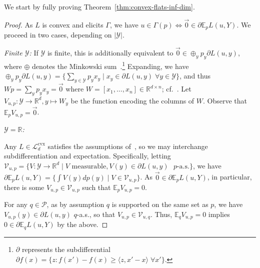 \documentclass{article} %
\newcommand{\Comments}{0}
\newcommand{\mynote}[2]{\ifnum\Comments=1\textcolor{#1}{#2}\fi}
\newcommand{\mytodo}[2]{\ifnum\Comments=1%
	\todo[linecolor=#1!80!black,backgroundcolor=#1,bordercolor=#1!80!black]{#2}\fi}
\newcommand{\jessie}[1]{\mynote{teal}{[JF: #1]}}
\newcommand{\btw}[1]{}%
\newcommand{\reals}{\mathbb{R}}
\newcommand{\supp}{\mathrm{supp}}
\newcommand{\E}{\mathbb{E}}
\newcommand{\Lcvx}{\mathcal{L}^{\mathrm{cvx}}}
\renewcommand{\P}{\mathcal{P}}
\newcommand{\V}{\mathcal{V}}
\newcommand{\Y}{\mathcal{Y}}
\newcommand{\exploss}[3]{\E_{#3} #1(#2,Y)}
\newcommand{\inprod}[2]{\langle #1, #2 \rangle}
\begin{document}
We start by fully proving Theorem~\ref{thm:convex-flats-inf-dim}.
\convexflats*
\begin{proof}
	As $L$ is convex and elicits $\Gamma$, we have $u \in \Gamma(p) \iff \vec 0 \in \partial \exploss{L}{u}{p}$. 
	We proceed in two cases, depending on $|\Y|$.
	
	\emph{Finite $\Y$: }
	If $\Y$ is finite, this is additionally equivalent to $\vec 0 \in \oplus_y p_y \partial L(u,y)$, where $\oplus$ denotes the Minkowski sum~\citep[Theorem 4.1.1]{hiriart2012fundamentals}.\footnote{$\partial$ represents the subdifferential $\partial f(x) = \{z : f(x') - f(x) \geq \inprod{z}{x'-x}\; \forall x' \}$.}
	Expanding, we have $\oplus_y p_y \partial L(u,y) = \{ \sum_{y\in\Y} p_y x_y \mid x_y \in \partial L(u,y) \; \forall y\in\Y\}$, and thus $W p = \sum_y p_y x_y = \vec 0$ where $W = [x_1, \ldots, x_n] \in \reals^{d\times n}$; cf.~\cite[$\mathbf{A}^m$ in Theorem 16]{ramaswamy2016convex}.
	Let $V_{u,p} : \Y \to \reals^d, y \mapsto W_y$ be the function encoding the columns of $W$.
	Observe that $\E_p V_{u,p} = \vec 0$.				
	
	\emph{$\Y=\reals$: }
	\btw{Note: this should work for any infinite $\Y$ so long as you have a good $\sigma$-algebra... working at least with $\Y \subseteq \reals$ just makes things easier since we can take the Borel $\sigma$-algebra for granted.}
	Any $L \in \Lcvx_d$ satisfies the assumptions of~\cite{ioffe1969minimization}, so we may interchange subdifferentiation and expectation.
	Specifically, letting $\V_{u,p} = \{V:\Y\to\reals^d \mid V \text{ measurable}, V(y) \in \partial L(u,y) \text{ $p$-a.s.}\}$, we have
	$\partial \E_p L(u,Y) = \{\int V(y)dp(y) \mid V\in\V_{u,p}\}$.
	As $\vec 0 \in \partial \E_p L(u,Y)$, in particular, there is some $V_{u,p} \in \V_{u,p}$ such that $\E_p V_{u,p} = 0$.
	\btw{Fleshing this out: $\exists E \subseteq \mathcal{B}(\Y)$ so that $p(E) = 0$ and $V(y) \in \partial L(u,y) \forall y \in E^c$.  Claim $q(E) = 0$, which would complete the claim that $V(y) \in \partial L(u,y) q$-a.s.  For contradiction, if $q(E) > 0$, then $\exists x \in E$ and open neighborhood $N_x \ni x$ with $q(N_x) > 0$.  Since $\supp(p) = \supp(q)$, we then have $p(N_x) >0$, contradicting $p(E) = 0$, and hence $V(y) \in \partial L(u,y)$ not $p$-a.s.  Therefore, we must have $q(E) = 0$, so $V(y) \in \partial L(u,y) q$-a.s.}
	For any $q\in\P$, as by assumption $q$ is supported on the same set as $p$, we have $V_{u,p}(y)\in\partial L(u,y)$ $q$-a.s., so that $V_{u,p}\in\V_{u,q}$\btw{I'm a bit too tired to see exactly how this follows, but it seems intuitively obvious. I'm okay to punt on it for the submission, but if someone has time to check, that would be great! \jessie{See above margin comment.  I think it's too much detail for the conference submission, but feel free to change my mind.}}.
	Thus, $\E_q V_{u,p} = 0$ implies $0\in\partial\E_q L(u,Y)$ by the above.
	\btw{For posterity, the bug: we want to conclude $\E_q V_{u,p} = 0 \implies q \in \Gamma_u$.  But the ``a.s.\ in $p$'' means we may not have $0 \in \partial \E_q L(u,Y)$, since maybe $V_{u,p}(y)$ is not in $\partial L(u,y)$ a.s.\ in $q$...}
	

\end{proof}
\end{document}
